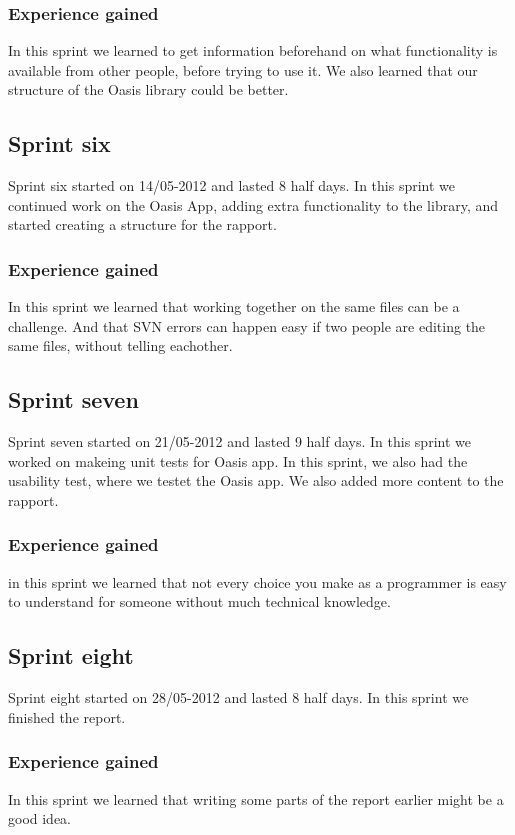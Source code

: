 \subsubsection{Experience gained}
In this sprint we learned to get information beforehand on what functionality is available from other people, before trying to use it. We also learned that our structure of the Oasis library could be better.

\subsection{Sprint six}
Sprint six started on 14/05-2012 and lasted 8 half days. In this sprint we continued work on the Oasis App, adding extra functionality to the library, and started creating a structure for the rapport.

\subsubsection{Experience gained}
In this sprint we learned that working together on the same files can be a challenge. And that SVN errors can happen easy if two people are editing the same files, without telling eachother.

\subsection{Sprint seven}
Sprint seven started on 21/05-2012 and lasted 9 half days. In this sprint we worked on makeing unit tests for Oasis app. In this sprint, we also had the usability test, where we testet the Oasis app. We also added more content to the rapport.

\subsubsection{Experience gained}
in this sprint we learned that not every choice you make as a programmer is easy to understand for someone without much technical knowledge.

\subsection{Sprint eight}
Sprint eight started on 28/05-2012 and lasted 8 half days. In this sprint we finished the report.

\subsubsection{Experience gained}
In this sprint we learned that writing some parts of the report earlier might be a good idea.